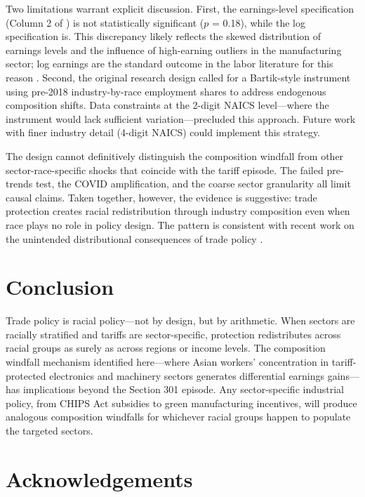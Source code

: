 \documentclass[12pt]{article}
\begin{document}
Two limitations warrant explicit discussion. First, the earnings-level specification (Column 2 of ) is not statistically significant ($p$ = 0.18), while the log specification is. This discrepancy likely reflects the skewed distribution of earnings levels and the influence of high-earning outliers in the manufacturing sector; log earnings are the standard outcome in the labor literature for this reason \citep{card1999causal}. Second, the original research design called for a Bartik-style instrument using pre-2018 industry-by-race employment shares to address endogenous composition shifts. Data constraints at the 2-digit NAICS level---where the instrument would lack sufficient variation---precluded this approach. Future work with finer industry detail (4-digit NAICS) could implement this strategy.

The design cannot definitively distinguish the composition windfall from other sector-race-specific shocks that coincide with the tariff episode. The failed pre-trends test, the COVID amplification, and the coarse sector granularity all limit causal claims. Taken together, however, the evidence is suggestive: trade protection creates racial redistribution through industry composition even when race plays no role in policy design. The pattern is consistent with recent work on the unintended distributional consequences of trade policy \citep{flaaen2020production,cavallo2021tariff,benguria2022trade}.

\section{Conclusion}

Trade policy is racial policy---not by design, but by arithmetic. When sectors are racially stratified and tariffs are sector-specific, protection redistributes across racial groups as surely as across regions or income levels. The composition windfall mechanism identified here---where Asian workers' concentration in tariff-protected electronics and machinery sectors generates differential earnings gains---has implications beyond the Section 301 episode. Any sector-specific industrial policy, from CHIPS Act subsidies to green manufacturing incentives, will produce analogous composition windfalls for whichever racial groups happen to populate the targeted sectors.

\section*{Acknowledgements}
\end{document}
